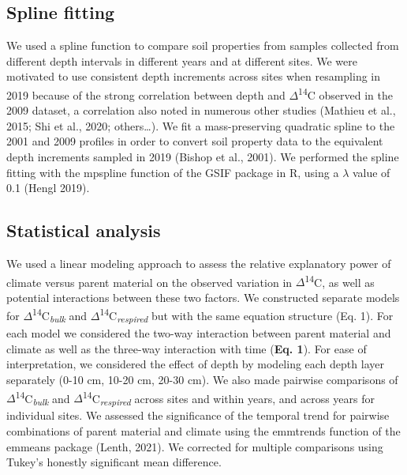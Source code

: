 \documentclass[english,man,floatsintext]{apa6}
\begin{document}
\hypertarget{spline-fitting}{%
\subsection{Spline fitting}\label{spline-fitting}}

We used a spline function to compare soil properties from samples collected from different depth intervals in different years and at different sites. We were motivated to use consistent depth increments across sites when resampling in 2019 because of the strong correlation between depth and \(\Delta\)\textsuperscript{14}C observed in the 2009 dataset, a correlation also noted in numerous other studies (Mathieu et al., 2015; Shi et al., 2020; others\ldots{}). We fit a mass-preserving quadratic spline to the 2001 and 2009 profiles in order to convert soil property data to the equivalent depth increments sampled in 2019 (Bishop et al., 2001). We performed the spline fitting with the mpspline function of the GSIF package in R, using a \(\lambda\) value of 0.1 (Hengl 2019).

\hypertarget{statistical-analysis}{%
\subsection{Statistical analysis}\label{statistical-analysis}}

We used a linear modeling approach to assess the relative explanatory power of climate versus parent material on the observed variation in \(\Delta\)\textsuperscript{14}C, as well as potential interactions between these two factors. We constructed separate models for \(\Delta\)\textsuperscript{14}C\textsubscript{\emph{bulk}} and \(\Delta\)\textsuperscript{14}C\textsubscript{\emph{respired}} but with the same equation structure (Eq. 1). For each model we considered the two-way interaction between parent material and climate as well as the three-way interaction with time (\textbf{Eq. 1}). For ease of interpretation, we considered the effect of depth by modeling each depth layer separately (0-10 cm, 10-20 cm, 20-30 cm). We also made pairwise comparisons of \(\Delta\)\textsuperscript{14}C\textsubscript{\emph{bulk}} and \(\Delta\)\textsuperscript{14}C\textsubscript{\emph{respired}} across sites and within years, and across years for individual sites. We assessed the significance of the temporal trend for pairwise combinations of parent material and climate using the emmtrends function of the emmeans package (Lenth, 2021). We corrected for multiple comparisons using Tukey's honestly significant mean difference.
\end{document}
